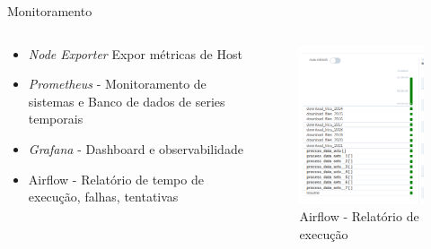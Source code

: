 \documentclass[10pt,brazil]{beamer}
\theoremstyle{definition}
\begin{document}
\begin{frame}{Monitoramento}
    \begin{columns}
      \begin{column}{0.5\textwidth}
  \begin{itemize}
    \item \emph{Node Exporter} Expor métricas de Host
    \item \emph{Prometheus} -  Monitoramento de sistemas e Banco de dados de series temporais
    \item \emph{Grafana} - Dashboard e observabilidade
    \item Airflow - Relatório de tempo de execução, falhas, tentativas
  \end{itemize}
\end{column}
\begin{column}{0.5\textwidth}
  \begin{center}
    \begin{figure}
      \centering
      \includegraphics[width=.9\textwidth]{report_execution_summary.png}
      \caption{Airflow - Relatório de execução}
    \end{figure}
  \end{center}
\end{column}
\end{columns}
\end{frame}
\end{document}
